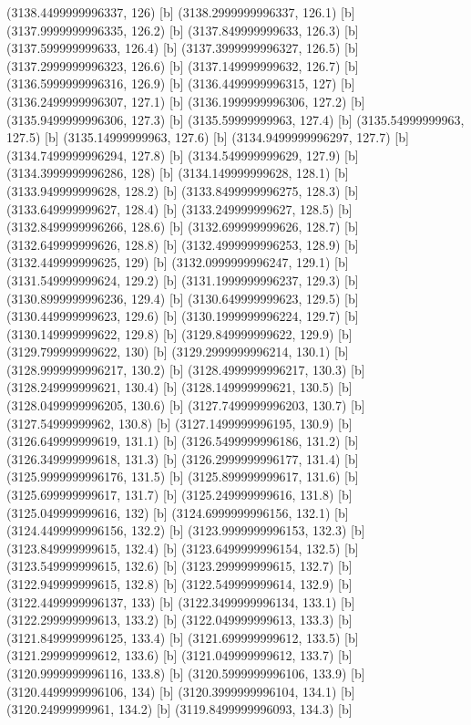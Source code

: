 {{{(3138.4499999996337, 126) [b] 
(3138.2999999996337, 126.1) [b] 
(3137.9999999996335, 126.2) [b] 
(3137.849999999633, 126.3) [b] 
(3137.599999999633, 126.4) [b] 
(3137.3999999996327, 126.5) [b] 
(3137.2999999996323, 126.6) [b] 
(3137.149999999632, 126.7) [b] 
(3136.5999999996316, 126.9) [b] 
(3136.4499999996315, 127) [b] 
(3136.2499999996307, 127.1) [b] 
(3136.1999999996306, 127.2) [b] 
(3135.9499999996306, 127.3) [b] 
(3135.59999999963, 127.4) [b] 
(3135.54999999963, 127.5) [b] 
(3135.14999999963, 127.6) [b] 
(3134.9499999996297, 127.7) [b] 
(3134.7499999996294, 127.8) [b] 
(3134.549999999629, 127.9) [b] 
(3134.3999999996286, 128) [b] 
(3134.149999999628, 128.1) [b] 
(3133.949999999628, 128.2) [b] 
(3133.8499999996275, 128.3) [b] 
(3133.649999999627, 128.4) [b] 
(3133.249999999627, 128.5) [b] 
(3132.8499999996266, 128.6) [b] 
(3132.699999999626, 128.7) [b] 
(3132.649999999626, 128.8) [b] 
(3132.4999999996253, 128.9) [b] 
(3132.449999999625, 129) [b] 
(3132.0999999996247, 129.1) [b] 
(3131.549999999624, 129.2) [b] 
(3131.1999999996237, 129.3) [b] 
(3130.8999999996236, 129.4) [b] 
(3130.649999999623, 129.5) [b] 
(3130.449999999623, 129.6) [b] 
(3130.1999999996224, 129.7) [b] 
(3130.149999999622, 129.8) [b] 
(3129.849999999622, 129.9) [b] 
(3129.799999999622, 130) [b] 
(3129.2999999996214, 130.1) [b] 
(3128.9999999996217, 130.2) [b] 
(3128.4999999996217, 130.3) [b] 
(3128.249999999621, 130.4) [b] 
(3128.149999999621, 130.5) [b] 
(3128.0499999996205, 130.6) [b] 
(3127.7499999996203, 130.7) [b] 
(3127.54999999962, 130.8) [b] 
(3127.1499999996195, 130.9) [b] 
(3126.649999999619, 131.1) [b] 
(3126.5499999996186, 131.2) [b] 
(3126.349999999618, 131.3) [b] 
(3126.2999999996177, 131.4) [b] 
(3125.9999999996176, 131.5) [b] 
(3125.899999999617, 131.6) [b] 
(3125.699999999617, 131.7) [b] 
(3125.249999999616, 131.8) [b] 
(3125.049999999616, 132) [b] 
(3124.6999999996156, 132.1) [b] 
(3124.4499999996156, 132.2) [b] 
(3123.9999999996153, 132.3) [b] 
(3123.849999999615, 132.4) [b] 
(3123.6499999996154, 132.5) [b] 
(3123.549999999615, 132.6) [b] 
(3123.299999999615, 132.7) [b] 
(3122.949999999615, 132.8) [b] 
(3122.549999999614, 132.9) [b] 
(3122.4499999996137, 133) [b] 
(3122.3499999996134, 133.1) [b] 
(3122.299999999613, 133.2) [b] 
(3122.049999999613, 133.3) [b] 
(3121.8499999996125, 133.4) [b] 
(3121.699999999612, 133.5) [b] 
(3121.299999999612, 133.6) [b] 
(3121.049999999612, 133.7) [b] 
(3120.9999999996116, 133.8) [b] 
(3120.5999999996106, 133.9) [b] 
(3120.4499999996106, 134) [b] 
(3120.3999999996104, 134.1) [b] 
(3120.24999999961, 134.2) [b] 
(3119.8499999996093, 134.3) [b] 
}}}
